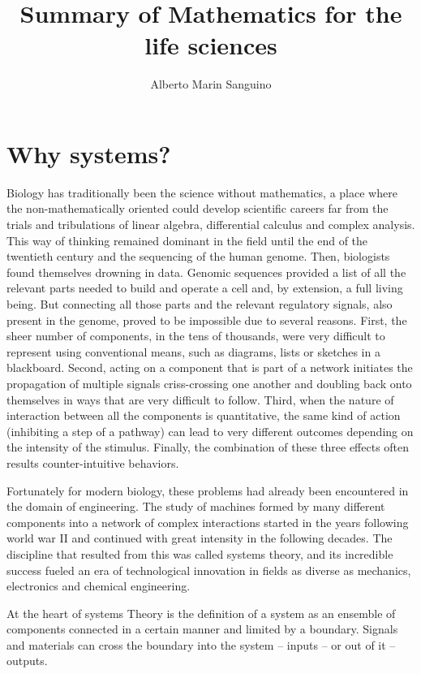 \documentclass[12pt]{article}
\title{Summary of Mathematics for the life sciences}
\author{Alberto Marin Sanguino}
\begin{document}
\maketitle
\tableofcontents
\section{Why systems?}

Biology has traditionally been the science without mathematics, a place where the non-mathematically oriented  could develop  scientific careers far from the trials and tribulations of linear algebra, differential calculus and complex analysis. This way of thinking remained dominant in the field until the end of the twentieth century and the sequencing of the human genome.
 Then, biologists found themselves drowning in data. Genomic sequences provided a list of all the relevant parts needed to build and operate a cell and, by extension, a full living being. But connecting all those parts and the relevant regulatory signals, also present in the genome, proved to be impossible due to several reasons. First, the sheer number of components, in the tens of thousands, were very difficult to represent using conventional means, such as diagrams, lists or sketches in a blackboard. Second, acting on a component that is part of a network initiates the propagation of multiple signals criss-crossing one another and doubling back onto themselves in ways that are very difficult to follow. Third, when the nature of interaction between all the components is quantitative, the same kind of action (inhibiting a step of a pathway) can lead to very different outcomes depending on the intensity of the stimulus. Finally, the combination of these three effects often results counter-intuitive behaviors.

Fortunately for modern biology, these problems had already been encountered in the domain of engineering. The study of machines formed by many different components into a network of complex interactions started in the years following world war II and continued with great intensity in the following decades. The discipline that resulted from this was called systems theory, and its incredible success fueled an era of technological innovation in fields as diverse as mechanics, electronics and chemical engineering.

At the heart of systems Theory is the definition of a system as an ensemble of components connected in a certain manner and limited by a boundary. Signals and materials can cross the boundary into the system -- inputs -- or out of it -- outputs.
\end{document}
